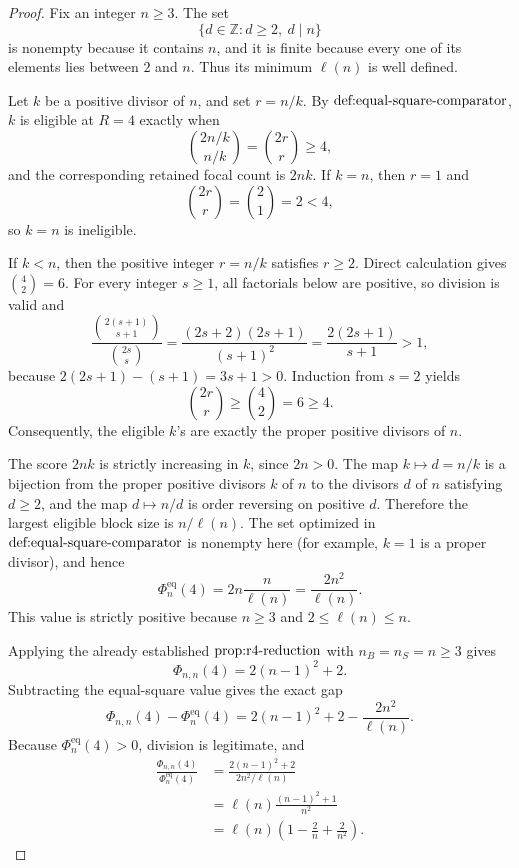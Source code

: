 \documentclass{article}
\begin{document}
\begin{proof}
Fix an integer \(n\ge3\). The set
\[
\{d\in\mathbb Z:d\ge2,\ d\mid n\}
\]
is nonempty because it contains \(n\), and it is finite because every one of its elements lies between \(2\) and \(n\). Thus its minimum \(\ell(n)\) is well defined.

Let \(k\) be a positive divisor of \(n\), and set \(r=n/k\). By \(\textnormal{def:equal-square-comparator}\), \(k\) is eligible at \(R=4\) exactly when
\[
\binom{2n/k}{n/k}=\binom{2r}{r}\ge4,
\]
and the corresponding retained focal count is \(2nk\). If \(k=n\), then \(r=1\) and
\[
\binom{2r}{r}=\binom21=2<4,
\]
so \(k=n\) is ineligible.

If \(k<n\), then the positive integer \(r=n/k\) satisfies \(r\ge2\). Direct calculation gives \(\binom42=6\). For every integer \(s\ge1\), all factorials below are positive, so division is valid and
\[
\frac{\binom{2(s+1)}{s+1}}{\binom{2s}{s}}
=\frac{(2s+2)(2s+1)}{(s+1)^2}
=\frac{2(2s+1)}{s+1}>1,
\]
because \(2(2s+1)-(s+1)=3s+1>0\). Induction from \(s=2\) yields
\[
\binom{2r}{r}\ge\binom42=6\ge4.
\]
Consequently, the eligible \(k\)'s are exactly the proper positive divisors of \(n\).

The score \(2nk\) is strictly increasing in \(k\), since \(2n>0\). The map \(k\mapsto d=n/k\) is a bijection from the proper positive divisors \(k\) of \(n\) to the divisors \(d\) of \(n\) satisfying \(d\ge2\), and the map \(d\mapsto n/d\) is order reversing on positive \(d\). Therefore the largest eligible block size is \(n/\ell(n)\). The set optimized in \(\textnormal{def:equal-square-comparator}\) is nonempty here (for example, \(k=1\) is a proper divisor), and hence
\[
\Phi_n^{\mathrm{eq}}(4)
=2n\frac{n}{\ell(n)}
=\frac{2n^2}{\ell(n)}.
\]
This value is strictly positive because \(n\ge3\) and \(2\le\ell(n)\le n\).

Applying the already established \(\textnormal{prop:r4-reduction}\) with \(n_B=n_S=n\ge3\) gives
\[
\Phi_{n,n}(4)=2(n-1)^2+2.
\]
Subtracting the equal-square value gives the exact gap
\[
\Phi_{n,n}(4)-\Phi_n^{\mathrm{eq}}(4)
=2(n-1)^2+2-\frac{2n^2}{\ell(n)}.
\]
Because \(\Phi_n^{\mathrm{eq}}(4)>0\), division is legitimate, and
\[
\begin{aligned}
\frac{\Phi_{n,n}(4)}{\Phi_n^{\mathrm{eq}}(4)}
&=\frac{2(n-1)^2+2}{2n^2/\ell(n)}\\
&=\ell(n)\frac{(n-1)^2+1}{n^2}\\
&=\ell(n)\left(1-\frac2n+\frac{2}{n^2}\right).
\end{aligned}
\]


\end{proof}
\end{document}
